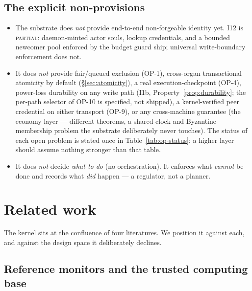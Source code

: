 \documentclass[11pt,a4paper]{article}
\newcommand{\BuiltWeak}{{\textcolor{hhink}{\textsc{partial}}}}
\theoremstyle{definition}
\theoremstyle{remark}
\begin{document}
\subsection{The explicit non-provisions}
\begin{itemize}[leftmargin=1.4em]
  \item The substrate does \emph{not} provide end-to-end non-forgeable identity
  yet. I12 is \BuiltWeak: daemon-minted actor souls, lookup credentials, and a
  bounded newcomer pool enforced by the budget guard ship; universal
  write-boundary enforcement does not.
  \item It does \emph{not} provide fair/queued exclusion (OP-1), cross-organ
  transactional atomicity by default (\S\ref{sec:atomicity}), a real
  execution-checkpoint (OP-4), power-loss durability on any write path (I1b,
  Property~\ref{prop:durability}; the per-path selector of OP-10 is specified, not
  shipped), a kernel-verified peer credential on either transport (OP-9), or any
  cross-machine guarantee (the economy layer --- different theorems, a shared-clock
  and Byzantine-membership problem the substrate deliberately never touches). The
  status of each open problem is stated once in Table~\ref{tab:op-status}; a higher
  layer should assume nothing stronger than that table.
  \item It does \emph{not} decide \emph{what to do} (no orchestration). It enforces
  what \emph{cannot} be done and records what \emph{did} happen --- a regulator, not
  a planner.
\end{itemize}

\section{Related work}
\label{sec:related}

The kernel sits at the confluence of four literatures. We position it against each,
and against the design space it deliberately declines.

\subsection{Reference monitors and the trusted computing base}
\end{document}

